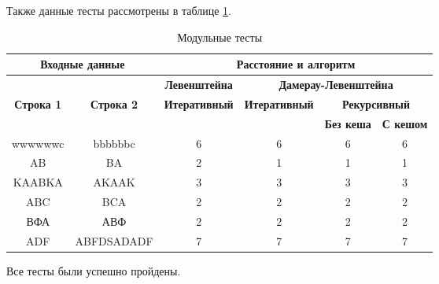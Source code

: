 Также данные тесты рассмотрены в таблице \ref{t:unit_tests}.

\begin{table}[ht]
	
	\begin{center}
		\small
		\begin{threeparttable}
		\caption{Модульные тесты}
        \label{t:unit_tests}
		\begin{tabular}{|c|c|c|c|c|c|}
			\hline
			\multicolumn{2}{|c|}{\bfseries Входные данные}
			& \multicolumn{4}{c|}{\bfseries Расстояние и алгоритм} \\ 
			\hline 
			&
			& \multicolumn{1}{c|}{\bfseries Левенштейна} 
			& \multicolumn{3}{c|}{\bfseries Дамерау-Левенштейна} \\ \cline{3-6}
			
			\bfseries Строка 1 & \bfseries Строка 2 & \bfseries Итеративный & \bfseries Итеративный
			
			& \multicolumn{2}{c|}{\bfseries Рекурсивный} \\ \cline{5-6}
			& & & & \bfseries Без кеша & \bfseries С кешом \\
			\hline
			wwwwwwc & bbbbbbc & 6 & 6 & 6 & 6 \\
			\hline
			AB & BA & 2 & 1 & 1 & 1 \\
			\hline
			KAABKA & AKAAK & 3 & 3 & 3 & 3 \\
			\hline
			ABC & BCA & 2 & 2 & 2 & 2 \\
			\hline
			ВФА & АВФ & 2 & 2 & 2 & 2 \\
			\hline
			ADF & ABFDSADADF & 7 & 7 & 7 & 7 \\
			\hline
		\end{tabular}	
		\end{threeparttable}
	\end{center}
\end{table}

Все тесты были успешно пройдены.